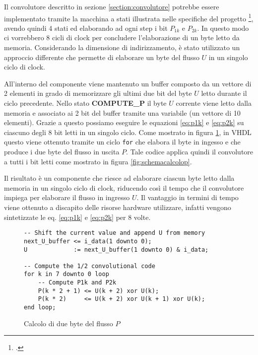 Il convolutore descritto in sezione \ref{section:convolutore} potrebbe essere implementato tramite la macchina a stati illustrata nelle specifiche del progetto \footcite{specifichedelprogetto}, avendo quindi 4 stati ed elaborando ad ogni step i bit $P_{1k}$ e $P_{2k}$. In questo modo ci vorrebbero 8 cicli di clock per concludere l'elaborazione di un byte letto da memoria. Considerando la dimensione di indirizzamento, è stato utilizzato un approccio differente che permette di elaborare un byte del flusso $U$ in un singolo ciclo di clock.

All'interno del componente viene mantenuto un buffer composto da un vettore di 2 elementi in grado di memorizzare gli ultimi due bit del byte $U$ letto durante il ciclo precedente. Nello stato \textbf{COMPUTE\_P} il byte $U$ corrente viene letto dalla memoria e associato ai 2 bit del buffer tramite una variabile (un vettore di 10 elementi). Grazie a questo possiamo eseguire le equazioni \ref{eq:p1k} e \ref{eq:p2k} su ciascuno degli 8 bit letti in un singolo ciclo. Come mostrato in figura \ref{code:calcolop}, in VHDL questo viene ottenuto tramite un ciclo \verb|for| che elabora il byte in ingesso e che produce i due byte del flusso in uscita $P$. Tale codice applica quindi il convolutore a tutti i bit letti come mostrato in figura \ref{fig:schemacalcolop}.

Il risultato è un componente che riesce ad elaborare ciascun byte letto dalla memoria in un singolo ciclo di clock, riducendo così il tempo che il convolutore impiega per elaborare il flusso in ingresso $U$. Il vantaggio in termini di tempo viene ottenuto a discapito delle risorse hardware utilizzare, infatti vengono sintetizzate le eq. \ref{eq:p1k} e \ref{eq:p2k} per 8 volte.

\begin{figure}[!ht]
    \centering
    \begin{varwidth}{\linewidth}
        \begin{verbatim}
-- Shift the current value and append U from memory
next_U_buffer <= i_data(1 downto 0);
U             := next_U_buffer(1 downto 0) & i_data;

-- Compute the 1/2 convolutional code
for k in 7 downto 0 loop
    -- Compute P1k and P2k
    P(k * 2 + 1) <= U(k + 2) xor U(k);
    P(k * 2)     <= U(k + 2) xor U(k + 1) xor U(k);
end loop;
    \end{verbatim}
    \end{varwidth}
    \caption{Calcolo di due byte del flusso $P$}
    \label{code:calcolop}
\end{figure}

